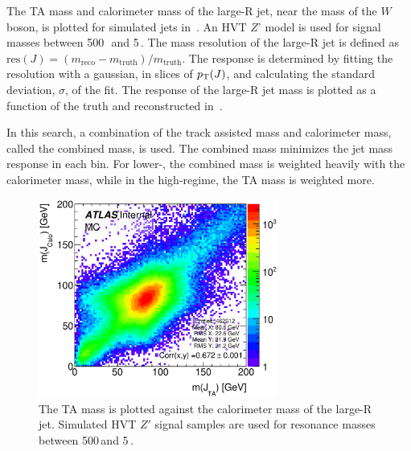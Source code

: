 The TA mass and calorimeter mass of the large-R jet, near the mass of the $W$ boson, is plotted for simulated jets in~\Fig{\ref{fig:ta_vs_calo_m}}. An HVT $Z$' model is used for signal masses between 500\,\GeV\, and 5\,\TeV. The mass resolution of the large-R jet is defined as $\text{res}(J) = (m_{\text{reco}}-m_{\text{truth}})/m_{\text{truth}}$. The response is determined by fitting the resolution with a gaussian, in slices of $p_{\text{T}}(J)$, and calculating the standard deviation, $\sigma$, of the fit.  The response of the large-R jet mass is plotted as a function of the truth \pT and reconstructed \pT in~\Fig{\ref{fig:ta_vs_calo_res}}.

In this search, a combination of the track assisted mass and calorimeter mass, called the combined mass, is used. The combined mass minimizes the jet mass response in each \pT bin. For lower-\pT, the combined mass is weighted heavily with the calorimeter mass, while in the high-\pT regime, the TA mass is weighted more.
 

\begin{figure}[htbp]
\centering
  \includegraphics[width=0.7\textwidth]{figures/Appendix/opt/TA/TA_vs_Calo_m}
  \caption[Track assisted mass versus calorimeter mass of the large-R jet]{ The TA mass is plotted against the calorimeter mass of the large-R jet. Simulated HVT $Z'$ signal samples are used for resonance masses between 500\,\GeV and 5\,\TeV.}
  \label{fig:ta_vs_calo_m}
\end{figure}

